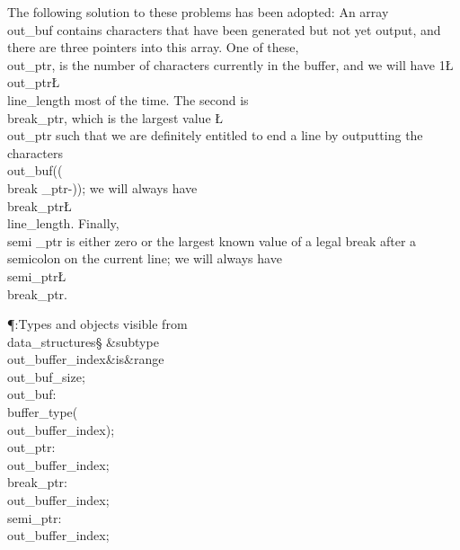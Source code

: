 The following solution to these problems has been adopted: An array
\\{out\_buf} contains characters that have been generated but not yet output,
and there are three pointers into this array. One of these, \\{out\_ptr}, is
the number of characters currently in the buffer, and we will have
1\?\L\?\\{out\_ptr}\?\L\?\\{line\_length} most of the time. The second is %
\\{break\_ptr},
which is the largest value \?\L\?\\{out\_ptr} such that we are definitely
entitled
to end a line by outputting the characters \\{out\_buf}\?(\?\to(\?\\{break%
\_ptr}\?-\?))\?;
we will always have \\{break\_ptr}\?\L\?\\{line\_length}. Finally, \\{semi%
\_ptr} is either
zero or the largest known value of a legal break after a semicolon
on the current line; we will always have \\{semi\_ptr}\?\L\?\\{break\_ptr}.

\Y\P\?\4:Types and objects visible from \\{data\_structures}\X\mathrel{+}\S%
\?\6
\&{subtype}\8\\{out\_buffer\_index}\8\&{is}\8\8\&{range}\?\to\?%
\\{out\_buf\_size};\6
\\{out\_buf}\?:\?\\{buffer\_type}\?\1(\?\\{out\_buffer\_index}\?\2)\?;%
\6
\\{out\_ptr}\?:\?\\{out\_buffer\_index};\6
\\{break\_ptr}\?:\?\\{out\_buffer\_index};\6
\\{semi\_ptr}\?:\?\\{out\_buffer\_index};\par
\fi

